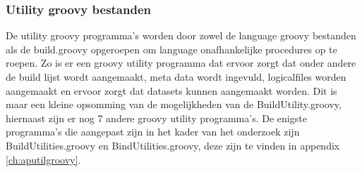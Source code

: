 \subsubsection{Utility groovy bestanden}
De utility groovy programma's worden door zowel de language groovy bestanden als de build.groovy opgeroepen om language onafhankelijke procedures op te roepen. Zo is er een groovy utility programma dat ervoor zorgt dat onder andere de build lijst wordt aangemaakt, meta data wordt ingevuld, logicalfiles worden aangemaakt en ervoor zorgt dat datasets kunnen aangemaakt worden. Dit is maar een kleine opsomming van de mogelijkheden van de BuildUtility.groovy, hiernaast zijn er nog 7 andere groovy utility programma's. De enigste programma's die aangepast zijn in het kader van het onderzoek zijn BuildUtilities.groovy en BindUtilities.groovy, deze zijn te vinden in appendix \ref{ch:aputilgroovy}. 
\\ \\
